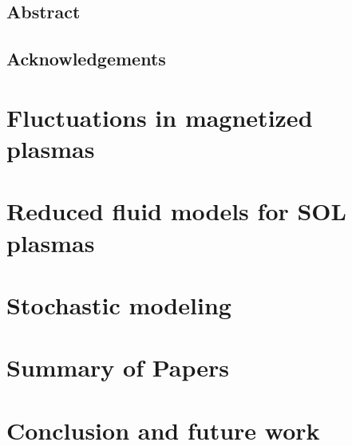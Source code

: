 \documentclass[11pt,twoside,openright]{book}
\begin{document}
\frontmatter


\newpage\null\thispagestyle{empty}\newpage

\setcounter{page}{1}\thispagestyle{empty}\newpage

\section*{Abstract}


\newpage\null\newpage
\section*{Acknowledgements}

\newpage\null\newpage

\tableofcontents

\mainmatter

\chapter{Fluctuations in magnetized plasmas}


\chapter{Reduced fluid models for SOL plasmas}


\chapter{Stochastic modeling}


\chapter{Summary of Papers}\label{ch:sum-paper}


\chapter{Conclusion and future work}\label{ch:conclusion}


\backmatter


\end{document}
